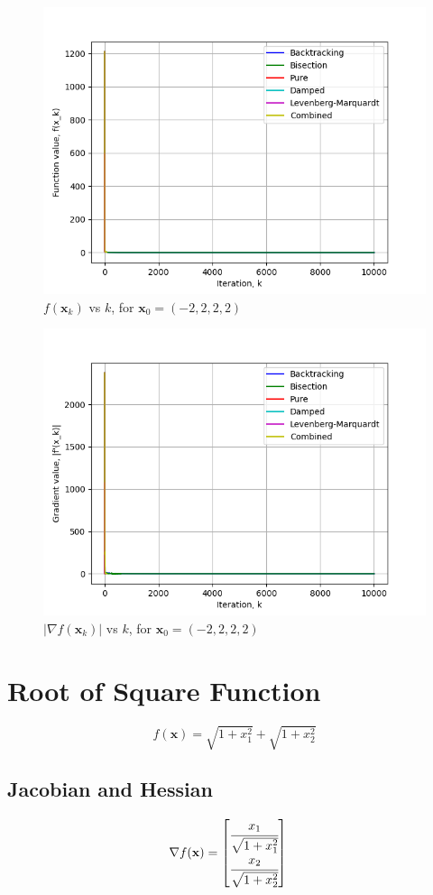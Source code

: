 \documentclass[a4paper]{article}
\begin{document}
\begin{figure}[H]
      \centering
      \includegraphics[width=.65\textwidth]{images/rosenbrock_function_vals.png}
      \caption{$f(\textbf{x}_k)$ vs $k$, for $\textbf{x}_0 = (-2, 2, 2, 2)$}
\end{figure}

\begin{figure}[H]
    \centering
    \includegraphics[width=.65\textwidth]{images/rosenbrock_function_grad.png}
    \caption{$|\nabla f(\textbf{x}_k)|$ vs $k$, for $\textbf{x}_0 = (-2, 2, 2, 2)$}
\end{figure}

\section{Root of Square Function}

$$f(\textbf{x}) = \sqrt{1 + x_1^2} + \sqrt{1 + x_2^2}$$

\subsection{Jacobian and Hessian}

\begin{align*}
\nabla f(\textbf{x}) &=
    \begin{bmatrix}
        \cfrac{x_1}{\sqrt{1 + x_1^2}} \\
        \cfrac{x_2}{\sqrt{1 + x_2^2}}
    \end{bmatrix}
\end{align*}
\end{document}
